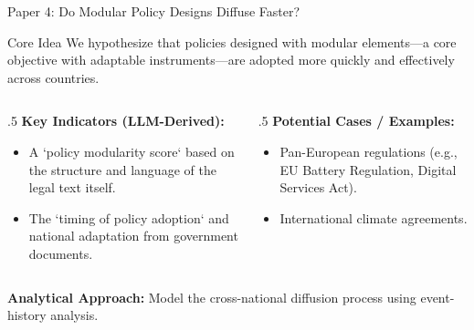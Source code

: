 \documentclass[10pt, aspectratio=169]{beamer}
\begin{document}
\begin{frame}{Paper 4: Do Modular Policy Designs Diffuse Faster?}
    \begin{block}{Core Idea}
        \alert{We hypothesize that policies designed with modular elements—a core objective with adaptable instruments—are adopted more quickly and effectively across countries.}
    \end{block}
    
    \vfill

    \begin{columns}[T]
        \begin{column}{.5\textwidth}
            \textbf{Key Indicators (LLM-Derived):}
            \begin{itemize}
                \item A `policy modularity score` based on the structure and language of the legal text itself.
                \item The `timing of policy adoption` and national adaptation from government documents.
            \end{itemize}
        \end{column}
        \begin{column}{.5\textwidth}
            \textbf{Potential Cases / Examples:}
            \begin{itemize}
                \item Pan-European regulations (e.g., EU Battery Regulation, Digital Services Act).
                \item International climate agreements.
            \end{itemize}
        \end{column}
    \end{columns}
    
    \vfill
    \textbf{\textcolor{aauDarkGold}{Analytical Approach:}} Model the cross-national diffusion process using event-history analysis.
\end{frame}
\end{document}
